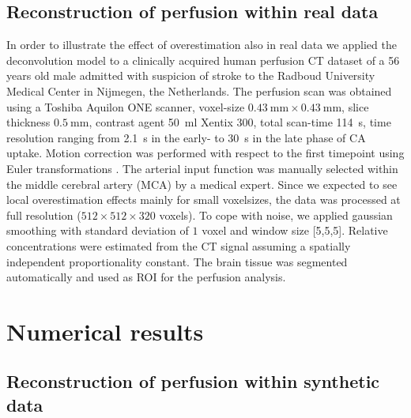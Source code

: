 \documentclass[final,5p,times,twocolumn]{elsarticle}
\begin{document}
	\subsection{Reconstruction of perfusion within real data}\label{sec:RealData}
	In order to illustrate the effect of overestimation also in real data we applied the deconvolution model to a clinically acquired human perfusion CT dataset of a 56 years old male admitted with suspicion of stroke to the Radboud University Medical Center in Nijmegen, the Netherlands.
	The perfusion scan was obtained using a Toshiba Aquilon ONE scanner, voxel-size $\SI{0.43}{\milli\meter}\times\SI{0.43}{\milli\meter}$, slice thickness $\SI{0.5}{\milli\meter}$, contrast agent \SI{50}{\milli\litre} Xentix 300, total scan-time \SI{114}{\second}, time resolution ranging from \SI{2.1}{\second} in the early- to \SI{30}{\second} in the late phase of CA uptake.
	Motion correction was performed with respect to the first timepoint using Euler transformations \cite{Mendrik11}.
	The arterial input function was manually selected within the middle cerebral artery (MCA) by a medical expert.
	Since we expected to see local overestimation effects mainly for small voxelsizes, the data was processed at full resolution ($512\times512\times320$ voxels). 
	To cope with noise, we applied gaussian smoothing with standard deviation of $1$ voxel and window size [5,5,5].
	Relative concentrations were estimated from the CT signal assuming a spatially independent proportionality constant. 
	The brain tissue was segmented automatically and used as ROI for the perfusion analysis.


	\section{Numerical results}	
	\subsection{Reconstruction of perfusion within synthetic data}\label{sec:RecPhantom}
\end{document}
